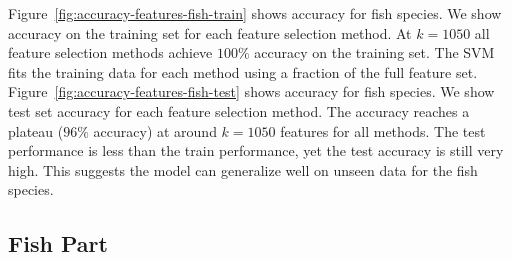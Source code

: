 \documentclass[runningheads]{llncs}
\begin{document}
Figure~\ref{fig:accuracy-features-fish-train} shows accuracy for fish species.
We show accuracy on the training set for each feature selection method.
At $k=1050$ all feature selection methods achieve $100\%$ accuracy on the training set.
The SVM fits the training data for each method using a fraction of the full feature set.
Figure~\ref{fig:accuracy-features-fish-test} shows accuracy for fish species.
We show test set accuracy for each feature selection method.
The accuracy reaches a plateau ($96\%$ accuracy) at around $k=1050$ features for all methods.
The test performance is less than the train performance, yet the test accuracy is still very high.
This suggests the model can generalize well on unseen data for the fish species.

\subsection{Fish Part}
\end{document}
